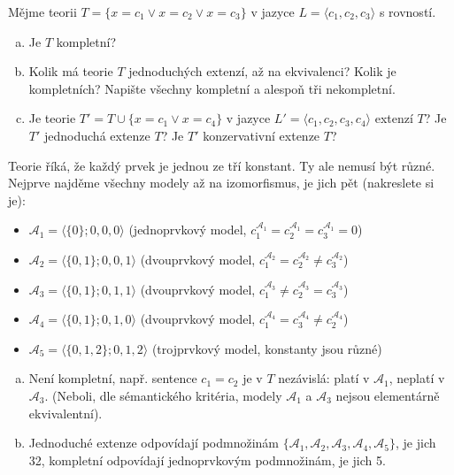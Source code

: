 \begin{problem}

    Mějme teorii $T=\{x=c_1 \vee x=c_2 \vee x=c_3\}$ v jazyce $L=\langle c_1,c_2,c_3\rangle$ s rovností.
    \begin{enumerate}[(a)]     
        \item Je $T$ kompletní?
        \item Kolik má teorie $T$ jednoduchých extenzí, až na ekvivalenci? Kolik je kompletních? Napište všechny kompletní a alespoň tři nekompletní.
        \item Je teorie $T'=T\cup\{x=c_1 \vee x=c_4\}$ v jazyce $L'=\langle c_1,c_2,c_3,c_4\rangle$ extenzí $T$? Je $T'$ jednoduchá extenze $T$? Je $T'$ konzervativní extenze $T$?
    \end{enumerate}

    \begin{solution}
        
        Teorie říká, že každý prvek je jednou ze tří konstant. Ty ale nemusí být různé. Nejprve najděme všechny modely až na izomorfismus, je jich pět (nakreslete si je):
        \begin{itemize}
            \item $\mathcal A_1=\langle\{0\};0,0,0\rangle$ (jednoprvkový model, $c_1^{\mathcal A_1}=c_2^{\mathcal A_1}=c_3^{\mathcal A_1}=0$)
            \item $\mathcal A_2=\langle\{0,1\};0,0,1\rangle$ (dvouprvkový model, $c_1^{\mathcal A_2}=c_2^{\mathcal A_2}\neq c_3^{\mathcal A_2}$)
            \item $\mathcal A_3=\langle\{0,1\};0,1,1\rangle$ (dvouprvkový model, $c_1^{\mathcal A_3}\neq c_2^{\mathcal A_3}=c_3^{\mathcal A_3}$) 
            \item $\mathcal A_4=\langle\{0,1\};0,1,0\rangle$ (dvouprvkový model, $c_1^{\mathcal A_4}=c_3^{\mathcal A_4}\neq c_2^{\mathcal A_4}$)
            \item $\mathcal A_5=\langle\{0,1,2\};0,1,2\rangle$ (trojprvkový model, konstanty jsou různé)
        \end{itemize}
        \begin{enumerate}[(a)]
            \item Není kompletní, např. sentence $c_1=c_2$ je v $T$ nezávislá: platí v $\mathcal A_1$,  neplatí v $\mathcal A_3$. (Neboli, dle sémantického kritéria, modely $\mathcal A_1$ a $\mathcal A_3$ nejsou elementárně ekvivalentní).
            \item Jednoduché extenze odpovídají podmnožinám $\{\mathcal A_1,\mathcal A_2,\mathcal A_3,\mathcal A_4,\mathcal A_5\}$, je jich 32, kompletní odpovídají jednoprvkovým podmnožinám, je jich 5.
            

\end{enumerate}
\end{solution}
\end{problem}
